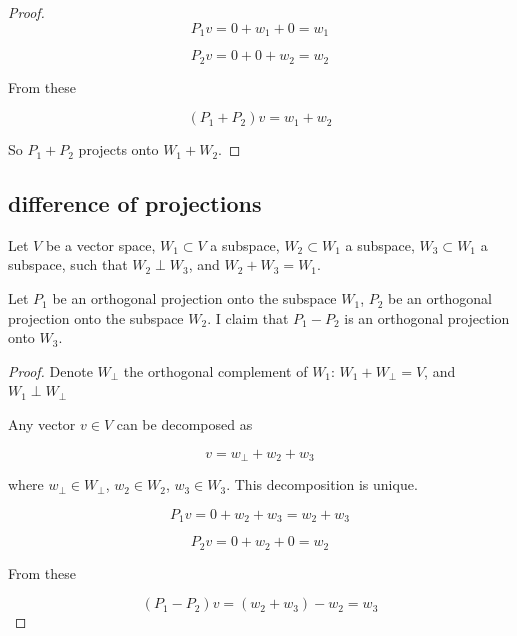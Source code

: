 \documentclass{article}
\begin{document}
\begin{appendices}
\begin{proof}
\begin{equation}
    P_1 v = 0 + w_1 + 0 = w_1
\end{equation}

\begin{equation}
    P_2 v = 0 + 0 + w_2 = w_2
\end{equation}

From these

\begin{equation}
    (P_1 + P_2) v = w_1 + w_2
\end{equation}

So $P_1 + P_2$ projects onto $W_1 + W_2$.

\end{proof}


\subsection{difference of projections} \label{app:diff_proj}

Let $V$ be a vector space, $W_1 \subset V$ a subspace, $W_2 \subset W_1$ a subspace, $W_3 \subset W_1$ a subspace, such that $W_2 \perp W_3$, and $W_2 + W_3 = W_1$.

Let $P_1$ be an orthogonal projection onto the subspace $W_1$, $P_2$ be an orthogonal projection onto the subspace $W_2$. I claim that $P_1 - P_2$ is an orthogonal projection onto $W_3$.

\begin{proof}
Denote $W_{\perp}$ the orthogonal complement of $W_1$: $W_1 + W_{\perp} = V$, and $W_1 \perp W_{\perp}$

Any vector $v \in V$ can be decomposed as

\begin{equation}
    v = w_{\perp} + w_2 + w_3
\end{equation}

where $w_{\perp} \in W_{\perp}$, $w_2 \in W_2$, $w_3 \in W_3$. This decomposition is unique.

\begin{equation}
    P_1 v = 0 + w_2 + w_3 = w_2 + w_3
\end{equation}

\begin{equation}
    P_2 v = 0 + w_2 + 0 = w_2
\end{equation}

From these

\begin{equation}
    (P_1 - P_2) v = (w_2 + w_3) - w_2 = w_3
\end{equation}


\end{proof}
\end{appendices}
\end{document}
